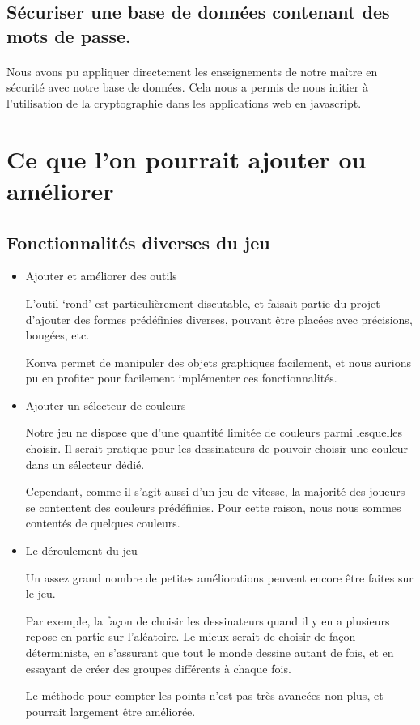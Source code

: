 \documentclass[11pt,a4paper]{article}
\begin{document}
        \subsection*{Sécuriser une base de données contenant des mots de passe.}
            \paragraph{}
            Nous avons pu appliquer directement les enseignements de notre maître en sécurité avec notre base de données.
            Cela nous a permis de nous initier à l'utilisation de la cryptographie dans les applications web en javascript.
    \section{Ce que l'on pourrait ajouter ou améliorer}
        \subsection*{Fonctionnalités diverses du jeu}
            \begin{itemize}
                \item Ajouter et améliorer des outils
                
                L'outil `rond' est particulièrement discutable,
                et faisait partie du projet d'ajouter des formes prédéfinies diverses,
                pouvant être placées avec précisions, bougées, etc.

                Konva permet de manipuler des objets graphiques facilement,
                et nous aurions pu en profiter pour facilement implémenter ces fonctionnalités.
                \item Ajouter un sélecteur de couleurs
                
                Notre jeu ne dispose que d'une quantité limitée de couleurs parmi lesquelles choisir.
                Il serait pratique pour les dessinateurs de pouvoir choisir une couleur dans un sélecteur dédié.

                Cependant, comme il s'agit aussi d'un jeu de vitesse,
                la majorité des joueurs se contentent des couleurs prédéfinies.
                Pour cette raison, nous nous sommes contentés de quelques couleurs.
                \item Le déroulement du jeu
                
                Un assez grand nombre de petites améliorations peuvent encore être faites sur le jeu.

                Par exemple, la façon de choisir les dessinateurs quand il y en a plusieurs repose en partie sur l'aléatoire.
                Le mieux serait de choisir de façon déterministe, en s'assurant que tout le monde dessine autant de fois,
                et en essayant de créer des groupes différents à chaque fois.

                Le méthode pour compter les points n'est pas très avancées non plus, et pourrait largement être améliorée.
            \end{itemize}
\end{document}

